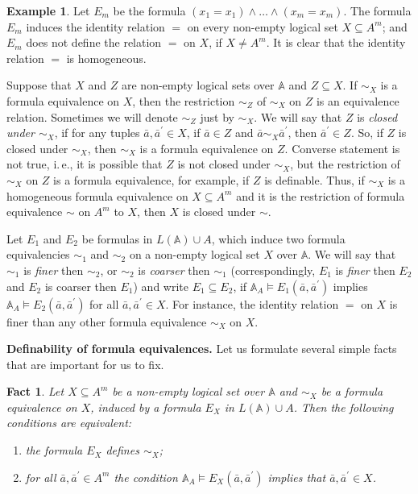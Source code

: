 \documentclass[12pt]{article}
\newtheorem{fact}{Fact}
\theoremstyle{definition}
\newtheorem{example}{Example}
\def\MA{{\mathbb{A}}}
\begin{document}
\begin{example}\label{ex:Em}
Let $E_m$ be the formula $(x_1=x_1)\wedge\ldots\wedge(x_m=x_m)$. The formula $E_m$ induces the identity relation $=$ on every non-empty logical set $X\subseteq A^m$; and $E_m$ does not define the relation $=$ on $X$, if $X\ne A^m$. It is clear that the identity relation $=$ is homogeneous.
\end{example}

Suppose that $X$ and $Z$ are non-empty logical sets over $\MA$ and $Z\subseteq X$. If $\sim_X$ is a formula equivalence on $X$, then the restriction $\sim_Z$ of $\sim_X$ on $Z$ is an equivalence relation. Sometimes we will denote $\sim_Z$ just by $\sim_X$. We will say that $Z$ is {\em closed under $\sim_X$}, if for any tuples $\bar a,\bar a^\prime\in X$, if $\bar a\in Z$ and $\bar a\sim_X \bar a^\prime$, then $\bar a^\prime\in Z$. So, if $Z$ is closed under $\sim_X$, then $\sim_X$ is a formula equivalence on $Z$. Converse statement is not true, i.\,e., it is possible that $Z$ is not closed under $\sim_X$, but the restriction of $\sim_X$ on $Z$ is a formula equivalence, for example, if $Z$ is definable. Thus, if $\sim_X$ is a homogeneous formula equivalence on $X\subseteq A^m$ and it is the restriction of formula equivalence $\sim$ on $A^m$ to $X$, then $X$ is closed under $\sim$.

Let $E_1$ and $E_2$ be formulas in $L(\MA)\cup A$, which induce two formula equivalencies $\sim_1$ and $\sim_2$ on a non-empty logical set $X$ over $\MA$. We will say that $\sim_1$ is {\em finer} then $\sim_2$, or $\sim_2$ is {\em coarser} then $\sim_1$ (correspondingly, $E_1$ is {\em finer} then $E_2$ and $E_2$ is coarser then $E_1$) and write $E_1\subseteq E_2$, if $\MA_A\models E_1(\bar a,\bar a^\prime)$ implies $\MA_A\models E_2(\bar a,\bar a^\prime)$ for all $\bar a,\bar a^\prime\in X$. For instance, the identity relation $=$ on $X$ is finer than any other formula equivalence $\sim_X$ on $X$.

{\bf Definability of formula equivalences.} 
Let us formulate several simple facts that are important for us to fix.

\begin{fact}
Let $X\subseteq A^m$ be a non-empty logical set over $\MA$ and $\sim_X$ be a formula equivalence on $X$, induced by a formula $E_X$ in $L(\MA)\cup A$. Then the following conditions are equivalent:
\begin{enumerate}[label=(\arabic*)]
\item the formula $E_X$ defines $\sim_X$;
\item for all $\bar a,\bar a^\prime\in A^m$ the condition $\MA_A\models E_X(\bar a, \bar a^\prime)$ implies that $\bar a,\bar a^\prime\in X$.
\end{enumerate}
\end{fact}
\end{document}
